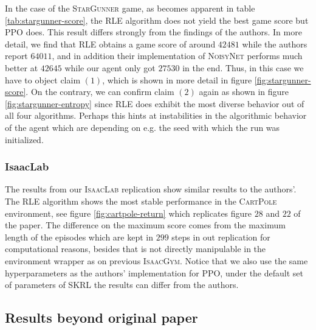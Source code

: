 \documentclass[10pt]{article} %
\begin{document}
\noindent In the case of the \textsc{StarGunner} game, as becomes apparent in table \ref{tab:stargunner-score}, the \textsc{RLE} algorithm does not yield the best game score but \textsc{PPO} does. This result differs strongly from the findings of the authors. In more detail, we find that \textsc{RLE} obtains a game score of around $42481$ while the authors report $64011$, and in addition their implementation of \textsc{NoisyNet} performs much better at $42645$ while our agent only got $27530$ in the end. Thus, in this case we have to object claim $(1)$, which is shown in more detail in figure \ref{fig:stargunner-score}. On the contrary, we can confirm claim $(2)$ again as shown in figure \ref{fig:stargunner-entropy} since \textsc{RLE} does exhibit the most diverse behavior out of all four algorithms. Perhaps this hints at instabilities in the algorithmic behavior of the agent which are depending on e.g. the seed with which the run was initialized.

\subsubsection{IsaacLab}
The results from our \textsc{IsaacLab} replication show similar results to the authors'. The \textsc{RLE} algorithm shows the most stable performance in the \textsc{CartPole} environment, see figure \ref{fig:cartpole-return} which replicates figure $28$ and $22$ of the paper. The difference on the maximum score comes from the maximum length of the episodes which are kept in $299$ steps in out replication for computational reasons, besides that is not directly manipulable in the environment wrapper as on previous \textsc{IsaacGym}. Notice that we also use the same hyperparameters as the authors' implementation for \textsc{PPO}, under the default set of parameters of SKRL the results can differ from the authors.

\subsection{Results beyond original paper}
\end{document}
